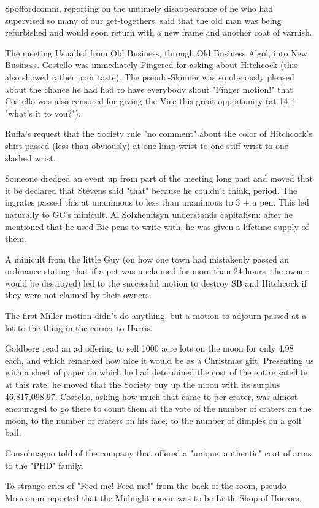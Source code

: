 \documentclass[12pt]{article}
\begin{document}
Spoffordcomm, reporting on the untimely disappearance of he who had supervised so many of our get-togethers, said that the old man was being refurbished and would soon return with a new frame and another coat of varnish.

The meeting Usualled from Old Business, through Old Business Algol, into New Business. Costello was immediately Fingered for asking about Hitchcock (this also showed rather poor taste). The pseudo-Skinner was so obviously pleased about the chance he had had to have everybody shout "Finger motion!" that Costello was also censored for giving the Vice this great opportunity (at 14-1-"what's it to you?").

Ruffa's request that the Society rule "no comment" about the color of Hitchcock's shirt passed (less than obviously) at one limp wrist to one stiff wrist to one slashed wrist.

Someone dredged an event up from part of the meeting long past and moved that it be declared that Stevens said "that" because he couldn't think, period. The ingrates passed this at unanimous to less than unanimous to 3 + a pen. This led naturally to GC's minicult. Al Solzhenitsyn understands capitalism: after he mentioned that he used Bic pens to write with, he was given a lifetime supply of them.

A minicult from the little Guy (on how one town had mistakenly passed an ordinance stating that if a pet was unclaimed for more than 24 hours, the owner would be destroyed) led to the successful motion to destroy SB and Hitchcock if they were not claimed by their owners.

The first Miller motion didn't do anything, but a motion to adjourn passed at a lot to the thing in the corner to Harris.

Goldberg read an ad offering to sell 1000 acre lots on the moon for only 4.98 each, and which remarked how nice it would be as a Christmas gift. Presenting us with a sheet of paper on which he had determined the cost of the entire satellite at this rate, he moved that the Society buy up the moon with its surplus 46,817,098.97. Costello, asking how much that came to per crater, was almost encouraged to go there to count them at the vote of the number of craters on the moon, to the number of craters on his face, to the number of dimples on a golf ball.

Consolmagno told of the company that offered a "unique, authentic" coat of arms to the "PHD" family.

To strange cries of "Feed me! Feed me!" from the back of the room, pseudo-Moocomm reported that the Midnight movie was to be Little Shop of Horrors.
\end{document}
